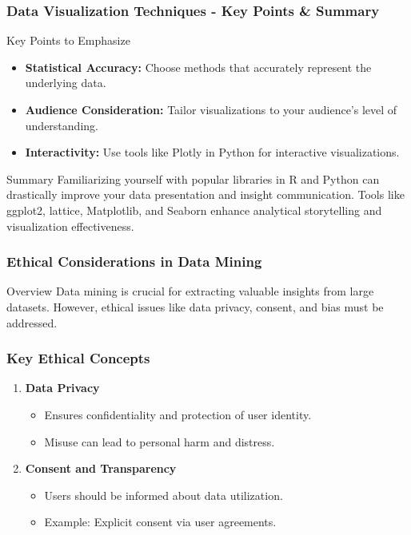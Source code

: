 \documentclass[aspectratio=169]{beamer}
\begin{document}
\begin{frame}[fragile]
    \frametitle{Data Visualization Techniques - Key Points & Summary}
    \begin{block}{Key Points to Emphasize}
        \begin{itemize}
            \item \textbf{Statistical Accuracy:} Choose methods that accurately represent the underlying data.
            \item \textbf{Audience Consideration:} Tailor visualizations to your audience's level of understanding.
            \item \textbf{Interactivity:} Use tools like Plotly in Python for interactive visualizations.
        \end{itemize}
    \end{block}

    \begin{block}{Summary}
        Familiarizing yourself with popular libraries in R and Python can drastically improve your data presentation and insight communication. 
        Tools like ggplot2, lattice, Matplotlib, and Seaborn enhance analytical storytelling and visualization effectiveness.
    \end{block}
\end{frame}

\begin{frame}[fragile]
    \frametitle{Ethical Considerations in Data Mining}
    \begin{block}{Overview}
        Data mining is crucial for extracting valuable insights from large datasets. 
        However, ethical issues like data privacy, consent, and bias must be addressed.
    \end{block}
\end{frame}

\begin{frame}[fragile]
    \frametitle{Key Ethical Concepts}
    \begin{enumerate}
        \item \textbf{Data Privacy}
            \begin{itemize}
                \item Ensures confidentiality and protection of user identity.
                \item Misuse can lead to personal harm and distress.
            \end{itemize}
        \item \textbf{Consent and Transparency}
            \begin{itemize}
                \item Users should be informed about data utilization.
                \item Example: Explicit consent via user agreements.
            \end{itemize}
    \end{enumerate}
\end{frame}
\end{document}
